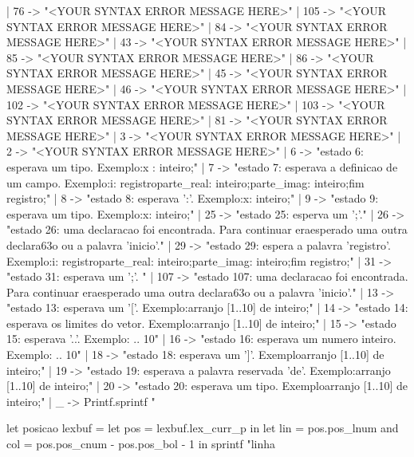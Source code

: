 \documentclass[12pt,a4paper,twoside]{article}
\begin{document}
\begin{terminal}
    | 76 ->
        "<YOUR SYNTAX ERROR MESSAGE HERE>\n"
    | 105 ->
        "<YOUR SYNTAX ERROR MESSAGE HERE>\n"
    | 84 ->
        "<YOUR SYNTAX ERROR MESSAGE HERE>\n"
    | 43 ->
        "<YOUR SYNTAX ERROR MESSAGE HERE>\n"
    | 85 ->
        "<YOUR SYNTAX ERROR MESSAGE HERE>\n"
    | 86 ->
        "<YOUR SYNTAX ERROR MESSAGE HERE>\n"
    | 45 ->
        "<YOUR SYNTAX ERROR MESSAGE HERE>\n"
    | 46 ->
        "<YOUR SYNTAX ERROR MESSAGE HERE>\n"
    | 102 ->
        "<YOUR SYNTAX ERROR MESSAGE HERE>\n"
    | 103 ->
        "<YOUR SYNTAX ERROR MESSAGE HERE>\n"
    | 81 ->
        "<YOUR SYNTAX ERROR MESSAGE HERE>\n"
    | 3 ->
        "<YOUR SYNTAX ERROR MESSAGE HERE>\n"
    | 2 ->
        "<YOUR SYNTAX ERROR MESSAGE HERE>\n"
    | 6 ->
        "estado 6: esperava um tipo. Exemplo:\n   x : inteiro;\n"
    | 7 ->
        "estado 7: esperava a definicao de um campo. Exemplo:\n   i: registro\n         parte_real: inteiro;\n         parte_imag: inteiro;\n      fim registro;\n      "
    | 8 ->
        "estado 8: esperava ':'. Exemplo:\n   x: inteiro;\n   "
    | 9 ->
        "estado 9: esperava um tipo. Exemplo:\n   x: inteiro;\n"
    | 25 ->
        "estado 25: esperva um ';'.\n"
    | 26 ->
        "estado 26: uma declaracao foi encontrada. Para continuar era\n   esperado uma outra declara\163o ou a palavra 'inicio'.\n"
    | 29 ->
        "estado 29: espera a palavra 'registro'. Exemplo:\n   i: registro\n         parte_real: inteiro;\n         parte_imag: inteiro;\n      fim registro;\n"
    | 31 ->
        "estado 31: esperava um ';'. \n"
    | 107 ->
        "estado 107: uma declaracao foi encontrada. Para continuar era\n   esperado uma outra declara\163o ou a palavra 'inicio'.\n"
    | 13 ->
        "estado 13: esperava um '['. Exemplo:\n   arranjo [1..10] de inteiro;\n"
    | 14 ->
        "estado 14: esperava os limites do vetor. Exemplo:\n   arranjo [1..10] de inteiro;\n"
    | 15 ->
        "estado 15: esperava '..'. Exemplo: .. 10\n"
    | 16 ->
        "estado 16: esperava um numero inteiro. Exemplo: .. 10\n"
    | 18 ->
        "estado 18: esperava um ']'. Exemplo\n   arranjo [1..10] de inteiro;\n"
    | 19 ->
        "estado 19: esperava a palavra reservada 'de'. Exemplo:\n   arranjo [1..10] de inteiro;\n"
    | 20 ->
        "estado 20: esperava um tipo. Exemplo\n   arranjo [1..10] de inteiro;\n"
    | _ ->
        Printf.sprintf "%

let posicao lexbuf =
    let pos = lexbuf.lex_curr_p in
    let lin = pos.pos_lnum
    and col = pos.pos_cnum - pos.pos_bol - 1 in
    sprintf "linha %


\end{terminal}
\end{document}
